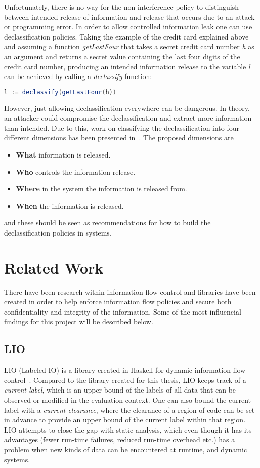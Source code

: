 Unfortunately, there is no way for the non-interference policy to distinguish between intended release of information and release that occurs due to an attack or programming error. In order to allow controlled information leak one can use declassification policies.
Taking the example of the credit card explained above and assuming a function \emph{getLastFour} that takes a secret credit card number \emph{h} as an argument and returns a secret value containing the last four digits of the credit card number, producing an intended information release to the variable \emph{l} can be achieved by calling a \emph{declassify} function:
\begin{center}
  \begin{lstlisting}[language=Java]
    l := declassify(getLastFour(h))
  \end{lstlisting}
\end{center}
However, just allowing declassification everywhere can be dangerous. In theory, an attacker could compromise the declassification and extract more information than intended. Due to this, work on classifying the declassification into four different dimensions has been presented in~\cite{declassification-dimensions}. The proposed dimensions are
\begin{itemize}
  \item \textbf{What} information is released.
  \item \textbf{Who} controls the information release.
  \item \textbf{Where} in the system the information is released from.
  \item \textbf{When} the information is released.
\end{itemize}
and these should be seen as recommendations for how to build the declassification policies in systems.
\section{Related Work}
\label{chapter:related}
There have been research within information flow control and libraries have been created in order to help enforce information flow policies and secure both confidentiality and integrity of the information. Some of the most influencial findings for this project will be described below.
\subsection{LIO}
LIO (Labeled IO) is a library created in Haskell for dynamic information flow control~\cite{lio-2011}. Compared to the library created for this thesis, LIO keeps track of a \emph{current label}, which is an upper bound of the labels of all data that can be observed or modified in the evaluation context. One can also bound the current label with a \emph{current clearance}, where the clearance of a region of code can be set in advance to provide an upper bound of the current label within that region. LIO attempts to close the gap with static analysis, which even though it has its advantages (fewer run-time failures, reduced run-time overhead etc.) has a problem when new kinds of data can be encountered at runtime, and dynamic systems.
